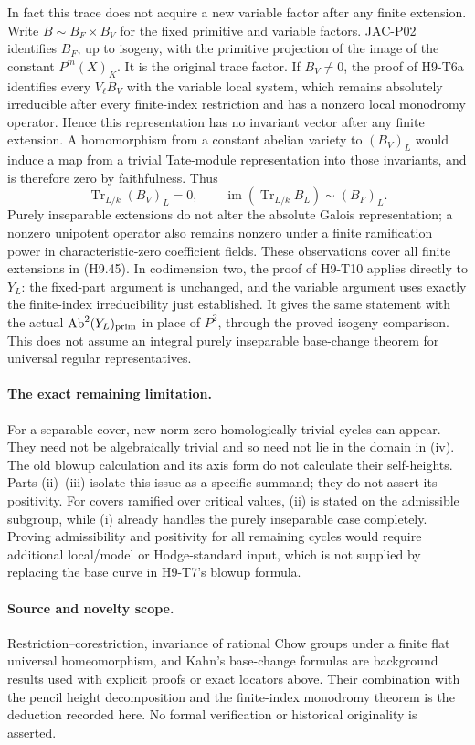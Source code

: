 In fact this trace does not acquire a new variable factor after any
finite extension. Write $B\sim B_F\times B_V$ for the fixed primitive
and variable factors. JAC-P02 identifies $B_F$, up to isogeny, with
the primitive projection of the image of the constant
$P^m(X)_K$. It is the original trace factor. If $B_V\ne0$, the proof
of H9-T6a identifies every $V_\ell B_V$ with the variable local system,
which remains absolutely irreducible after every finite-index
restriction and has a nonzero local monodromy operator. Hence this
representation has no invariant vector after any finite extension.
A homomorphism from a constant abelian variety to $(B_V)_L$ would
induce a map from a trivial Tate-module representation into those
invariants, and is therefore zero by faithfulness. Thus
\[
 \operatorname{Tr}_{L/k}(B_V)_L=0,
 \qquad
 \operatorname{im}(\operatorname{Tr}_{L/k}B_L)
        \sim (B_F)_L.                                      \tag{H9.45}
\]
Purely inseparable extensions do not alter the absolute Galois
representation; a nonzero unipotent operator also remains nonzero
under a finite ramification power in characteristic-zero coefficient
fields. These observations cover all finite extensions in (H9.45).
In codimension two, the proof of H9-T10 applies directly to $Y_L$:
the fixed-part argument is unchanged, and the variable argument uses
exactly the finite-index irreducibility just established. It gives the
same statement with the actual
$\operatorname{Ab}^2(Y_L)_{\rm prim}$ in place of $P^2$, through the
proved isogeny comparison. This does not assume an integral purely
inseparable base-change theorem for universal regular representatives.

\paragraph{The exact remaining limitation.}
For a separable cover, new norm-zero homologically trivial cycles can
appear. They need not be algebraically trivial and so need not lie in
the domain in (iv). The old blowup calculation and its axis form do not
calculate their self-heights. Parts (ii)--(iii) isolate this issue as a
specific summand; they do not assert its positivity. For covers ramified
over critical values, (ii) is stated on the admissible subgroup, while
(i) already handles the purely inseparable case completely. Proving
admissibility and positivity for all remaining cycles would require
additional local/model or Hodge-standard input, which is not supplied
by replacing the base curve in H9-T7's blowup formula.

\paragraph{Source and novelty scope.}
Restriction--corestriction, invariance of rational Chow groups under a
finite flat universal homeomorphism, and Kahn's base-change formulas
are background results used with explicit proofs or exact locators
above. Their combination with the pencil height decomposition and
the finite-index monodromy theorem is the deduction recorded here.
No formal verification or historical originality is asserted.
